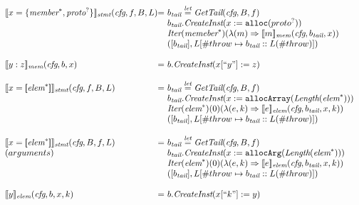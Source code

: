\[\begin{array}{l@{}l@{~}l}
\transfun{\irobject{x}{\emph{member}^*,\emph{proto}^{?}}}_{\emph{stmt}}(\emph{cfg}, f, B, L) & = &
b_{\emph{tail}} \letval \GetTail(\emph{cfg}, B, f)\\
& & b_{\emph{tail}}.\emph{CreateInst}(x := \TT{alloc}(proto^{?}))\\
& & \Iter(\emph{memeber}^*)(\lambda(m) \Rightarrow \transfun{m}_{\emph{mem}}(\emph{cfg}, b_{\emph{tail}}, x))\\
& & ([b_{\emph{tail}}], L[\#throw \mapsto b_{\emph{tail}} :: L(\#throw)])\\
& & \\

\transfun{\ircfgfield{y}{z}}_{\emph{mem}}(\emph{cfg}, b, x) & = &
b.\emph{CreateInst}(x[``y"] := z)\\
& & \\

\transfun{\irarray{x}{\emph{elem}^*}}_{\emph{stmt}}(\emph{cfg}, f, B, L) & = &
b_{\emph{tail}} \letval \GetTail(\emph{cfg}, B, f)\\
& & b_{\emph{tail}}.\emph{CreateInst}(x :=\TT{allocArray}(\Length(\emph{elem}^*)))\\
& & \Iter(\emph{elem}^*)(0)(\lambda(e,k)\Rightarrow\transfun{e}_{\emph{elem}}(\emph{cfg}, b_{\emph{tail}}, x, k))\\
& & ([b_{\emph{tail}}],L[\#throw \mapsto b_{\emph{tail}}::L(\#throw)])\\
& & \\

\transfun{\irarray{x}{\emph{elem}^*}}_{\emph{stmt}}(\emph{cfg}, B, f, L) & = &
b_{\emph{tail}} \letval \GetTail(\emph{cfg}, B, f)\\
(arguments) & & b_{\emph{tail}}.\emph{CreateInst}(x :=\TT{allocArg}(\Length(\emph{elem}^*)))\\
& & \Iter(\emph{elem}^*)(0)(\lambda(e,k) \Rightarrow \transfun{e}_{\emph{elem}}(\emph{cfg}, b_{\emph{tail}}, x, k))\\
& & ([b_{\emph{tail}}], L[\#throw \mapsto b_{\emph{tail}}::L(\#throw)])\\
& & \\

\transfun{y}_{\emph{elem}}(\emph{cfg}, b, x, k) & = &
b.\emph{CreateInst}(x[``k"] := y)\\
& & \\


\end{array}\]
